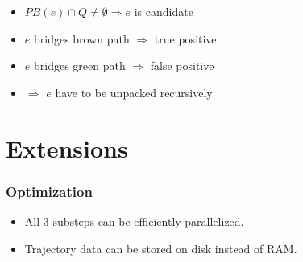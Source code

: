 \documentclass[10pt, t,
aspectratio=169,%
]{beamer}
\newcommand{\getAssociatedTrajectories}{GetAssociatedTrajectories\xspace}
\begin{document}
\begin{frame}
\begin{minipage}[t]{0.45\textwidth}
	\end{minipage}
	\hfill
	\begin{minipage}[t]{0.45\textwidth}
		\vspace{0pt}
		\begin{itemize}
			\item<2-> $PB(e) \cap Q \neq \emptyset \Rightarrow e$ is candidate
			\item<3-> $e$ bridges brown path  $\Rightarrow$ true positive
			\item<4-> $e$ bridges green path  $\Rightarrow$ false positive
			\item<5-> $\Rightarrow$ $e$ have to be unpacked recursively
		\end{itemize}
	\end{minipage}
\end{frame}

%

\section{Extensions}

\begin{frame}
	\frametitle{Optimization}
	\begin{itemize}
		\item<1-> All 3 substeps can be efficiently parallelized.
		\item<2-> Trajectory data can be stored on disk instead of RAM.
	\end{itemize}
\end{frame}
\end{document}
